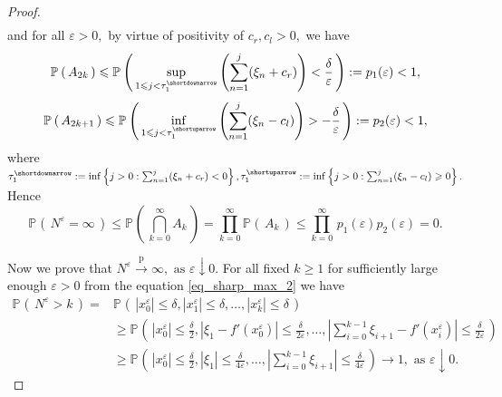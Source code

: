 \documentclass{article}
\theoremstyle{plain}
\theoremstyle{definition}
\theoremstyle{remark}
\newcommand{\p}[2][]{{\mathbb{P}}_{#1} \left( \, #2 \, \right) } %
\newcommand{\ra }{ \rightarrow} %
\newcommand{\pra}{ \overset{\mathrm{p}}{\longrightarrow}} %
\newcommand{\eps}{ \varepsilon}
\begin{document}
\begin{proof}
\begin{equation*}
\begin{split}
\end{split}
\end{equation*}
and for all $\varepsilon > 0,$ by virtue of positivity of $c_r, c_l >0,$ we have
\begin{equation*}
    \p{A_{2k}} \leqslant \p{ \sup\limits_{1\leqslant j <   \tau_{1}^{\shortdownarrow}} \left( \sum_{n= 1}^j (\xi_n + c_r)\right) < \frac{\delta}{\varepsilon} } := p_{1}(\varepsilon) < 1, 
\end{equation*}
\begin{equation*}
    \p{A_{2k+1}} \leqslant  \p{ \inf\limits_{1\leqslant j <   \tau_{1}^{\shortuparrow}} \left( \sum_{n= 1}^j (\xi_n - c_l)\right) > -\frac{\delta}{\varepsilon}} := p_{2}(\varepsilon) < 1, 
\end{equation*}
where $\tau_{1}^{\shortdownarrow}:=  \inf \left\{j> 0 : \sum_{n= 1}^j (\xi_n + c_r) <0\right\}, \tau_{1}^{\shortuparrow}:= \inf \left\{j> 0 : \sum_{n= 1}^j (\xi_n - c_l) \geqslant 0\right\}.$
Hence
\begin{equation*}
     \p{N^{\varepsilon} = \infty} \leqslant \p{\bigcap_{k=0}^{\infty} A_k }  = \prod_{k=0}^{\infty}\p{A_k } \leqslant 
 \prod_{k=0}^{\infty} \, p_{1}(\varepsilon) p_{2}(\varepsilon) = 0. 
\end{equation*}

Now we prove that $N^{\eps} \pra \infty, \text{ as } \varepsilon \downarrow 0$. For all fixed $k \geqslant 1$ for sufficiently large enough $\varepsilon>0$ from the equation \eqref{eq_sharp_max_2}   we have
\begin{equation*}
\begin{split}
\p{N^{\varepsilon} > k} =  &  \p{\left|x_0^{\varepsilon}\right| \leqslant \delta, \left|x_1^{\varepsilon}\right| \leqslant \delta, \ldots, \left|x_k^{\varepsilon}\right| \leqslant \delta} \\ 
& \geqslant  \p{\left|x_0^{\varepsilon}\right| \leqslant \frac{\delta}{2}, \left|\xi_1 - f'(x_0^{\varepsilon})\right| \leqslant \frac{\delta}{2\varepsilon}, \ldots, \left| \sum_{i=0}^{k-1} \xi_{i+1} - f'(x_i^{\varepsilon})\right| \leqslant \frac{\delta}{2\varepsilon} }\\
& \geqslant  \p{\left|x_0^{\varepsilon}\right| \leqslant \frac{\delta}{2}, \left|\xi_1\right| \leqslant \frac{\delta}{4\varepsilon}, \ldots, \left| \sum_{i=0}^{k-1} \xi_{i+1} \right| \leqslant \frac{\delta}{4\varepsilon} } \ra 1, \text{ as } \varepsilon \downarrow 0.
\end{split} 
\end{equation*}
\end{proof}
\end{document}
